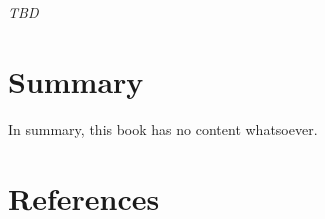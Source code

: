\documentclass[
  letterpaper,
  DIV=11,
  numbers=noendperiod]{scrreprt}
\begin{document}
\emph{TBD}


\chapter{Summary}\label{summary}

In summary, this book has no content whatsoever.


\chapter*{References}\label{references}


\label{refs}
\end{document}
